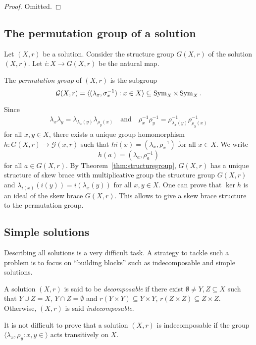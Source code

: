     \begin{proof}
        Omitted.
    \end{proof}

    \subsection{The permutation group of a solution}

    Let $(X,r)$ be a solution. Consider the structure group $G(X,r)$ of the solution $(X,r)$. Let $i\colon X\to G(X,r)$ be the natural map. 

    The \emph{permutation group} of $(X,r)$ is the subgroup
    \[\mathcal{G}(X,r)=\langle (\lambda_x,\sigma^{-1}_x) : x\in X\rangle\subseteq\operatorname{Sym}_X\times\operatorname{Sym}_X.\]
    
    Since 
    \begin{align*}
        \lambda_x\lambda_y=\lambda_{\lambda_x(y)}\lambda_{\rho_y(x)}\quad\text{and}\quad \rho^{-1}_x\rho^{-1}_y=\rho^{-1}_{\lambda_x(y)}\rho^{-1}_{\rho_y(x)}
    \end{align*}
    for all $x,y\in X$, there exists a unique group homomorphism
    $h\colon G(X,r)\to \mathcal{G}(x,r)$ such that $hi(x)=(\lambda_x,\rho^{-1}_x)$ for all $x\in X$. We write
    \[ h(a)=(\lambda_a,\rho_a^{-1})\]
    for all $a\in G(X,r)$.
    By Theorem~\ref{thm:structuregroup}, $G(X,r)$ has a unique structure of skew brace with multiplicative group the structure group $G(X,r)$ and $\lambda_{i(x)}(i(y))=i(\lambda_x(y))$ for all $x,y\in X$. One can prove that $\ker h$ is an ideal of the skew brace $G(X,r)$. This allows to give a skew brace structure to the permutation group.

\subsection{Simple solutions}

Describing all solutions is a very difficult task. A strategy to tackle such a problem is to focus on ``building blocks'' such as indecomposable and simple solutions. 

\begin{definition}
    A solution $(X,r)$ is said to be \emph{decomposable} if there exist $\emptyset \neq Y,Z \subseteq X$ such that $Y\cup Z = X$, $Y \cap Z = \emptyset$ and $r(Y\times Y)\subseteq Y\times Y$, $r(Z\times Z)\subseteq Z \times Z$. Otherwise, $(X,r)$ is said \emph{indecomposable}.
\end{definition}

It is not difficult to prove that a solution $(X,r)$ is indecomposable if the group $\langle \lambda_x, \rho_y \colon x, y \in \rangle$ acts transitively on $X$.

